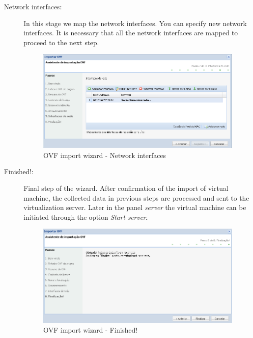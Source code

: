 \begin{description}
    \item[Network interfaces:] In this stage we map the network interfaces. You can specify new network interfaces.
         It is necessary that all the network interfaces are mapped to proceed to the next step.
		\begin{figure}[H]
            \begin{center}
            \includegraphics[scale=0.5]{screenshots/ovf_import_networks.png}
            \caption{OVF import wizard - Network interfaces}
            \label{fig:ovf_import_networks}
            \end{center}
        \end{figure}

    \item[Finished!:] Final step of the wizard. After confirmation of the import of virtual machine, the collected data in previous steps are processed and sent to the virtualization server. Later in the panel \emph{server} the virtual machine can be initiated through the option \emph{Start server}.
		\begin{figure}[H]
			\begin{center}
			\includegraphics[scale=0.5]{screenshots/ovf_import_finish.png}
            \caption{OVF import wizard - Finished!}
			\label{fig:ovf_import_finish}
			\end{center}
		\end{figure}

\end{description}

